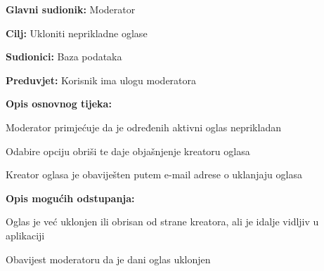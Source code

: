                     \noindent {}
					\begin{packed_item}
	
						\item \textbf{Glavni sudionik: }Moderator
						\item  \textbf{Cilj:} Ukloniti neprikladne oglase
						\item  \textbf{Sudionici:} Baza podataka
						\item  \textbf{Preduvjet:} Korisnik ima ulogu moderatora
						\item  \textbf{Opis osnovnog tijeka:}
						
						\item[] \begin{packed_enum}
	
							\item Moderator primjećuje da je određenih aktivni oglas neprikladan
							\item Odabire opciju obriši te daje objašnjenje kreatoru oglasa
							\item Kreator oglasa je obaviješten putem e-mail adrese o uklanjaju oglasa
						\end{packed_enum}
						
						\item  \textbf{Opis mogućih odstupanja:}
						
						\item[] \begin{packed_item}
	
							\item[2.a] Oglas je već uklonjen ili obrisan od strane kreatora, ali je idalje vidljiv u aplikaciji
							\item[] \begin{packed_enum}
								
								\item Obavijest moderatoru da je dani oglas uklonjen

								
							\end{packed_enum}
						\end{packed_item}
					\end{packed_item}				
				
